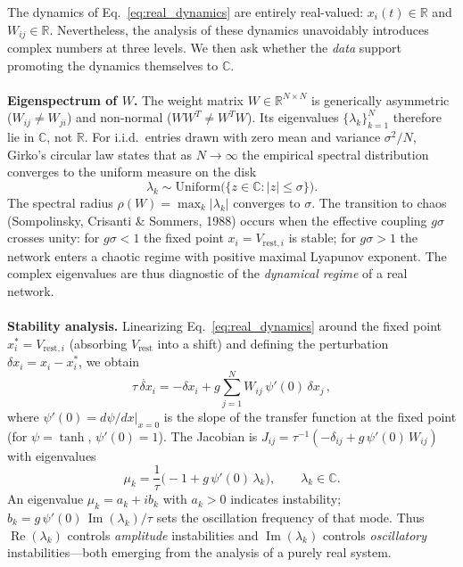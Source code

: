 \documentclass[11pt,a4paper]{article}
\newcommand{\R}{\mathbb{R}}
\newcommand{\C}{\mathbb{C}}
\newcommand{\re}{\operatorname{Re}}
\newcommand{\im}{\operatorname{Im}}
\begin{document}
The dynamics of Eq.~\eqref{eq:real_dynamics} are entirely real-valued: $x_i(t) \in \R$ and $W_{ij} \in \R$. Nevertheless, the {analysis of these dynamics unavoidably introduces complex numbers at three levels. We then ask whether the \emph{data} support promoting the dynamics themselves to $\C$.
\\
\\
\textbf{Eigenspectrum of $W$.}
The weight matrix $W \in \R^{N\times N}$ is generically asymmetric ($W_{ij} \neq W_{ji}$) and non-normal ($WW^T \neq W^T W$). Its eigenvalues $\{\lambda_k\}_{k=1}^{N}$ therefore lie in $\C$, not $\R$. For i.i.d.\ entries drawn with zero mean and variance $\sigma^2/N$, Girko's circular law states that as $N \to \infty$ the empirical spectral distribution converges to the uniform measure on the disk
\begin{equation}
\lambda_k \sim \text{Uniform}\bigl(\{z \in \C : |z| \leq \sigma\}\bigr).
\label{eq:girko}
\end{equation}
The spectral radius $\rho(W) = \max_k |\lambda_k|$ converges to $\sigma$. The transition to chaos (Sompolinsky, Crisanti \& Sommers, 1988) occurs when the effective coupling $g\sigma$ crosses unity: for $g\sigma < 1$ the fixed point $x_i = V_{\text{rest},i}$ is stable; for $g\sigma > 1$ the network enters a chaotic regime with positive maximal Lyapunov exponent. The complex eigenvalues are thus diagnostic of the \emph{dynamical regime} of a real network.
\\
\\
\textbf{Stability analysis.}
Linearizing Eq.~\eqref{eq:real_dynamics} around the fixed point $x_i^* = V_{\text{rest},i}$ (absorbing $V_{\text{rest}}$ into a shift) and defining the perturbation $\delta x_i = x_i - x_i^*$, we obtain
\begin{equation}
\tau\,\dot{\delta x}_i = -\delta x_i + g\sum_{j=1}^{N} W_{ij}\,\psi'(0)\,\delta x_j\,,
\label{eq:linearized}
\end{equation}
where $\psi'(0) = d\psi/dx|_{x=0}$ is the slope of the transfer function at the fixed point (for $\psi = \tanh$, $\psi'(0) = 1$). The Jacobian is $J_{ij} = \tau^{-1}(-\delta_{ij} + g\,\psi'(0)\,W_{ij})$ with eigenvalues
\begin{equation}
\mu_k = \frac{1}{\tau}\bigl(-1 + g\,\psi'(0)\,\lambda_k\bigr), \qquad \lambda_k \in \C.
\label{eq:jacobian_eig}
\end{equation}
An eigenvalue $\mu_k = a_k + i b_k$ with $a_k > 0$ indicates instability; $b_k = g\,\psi'(0)\,\im(\lambda_k)/\tau$ sets the oscillation frequency of that mode. Thus $\re(\lambda_k)$ controls \emph{amplitude} instabilities and $\im(\lambda_k)$ controls \emph{oscillatory} instabilities---both emerging from the analysis of a purely real system.
}
\end{document}
